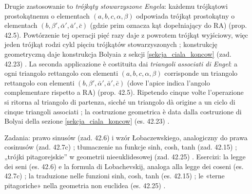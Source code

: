 Drugie zastosowanie to \emph{trójkąty stowarzyszone Engela}: każdemu trójkątowi prostokątnemu o elementach $(a, b, c, \alpha, \beta)$ odpowiada trójkąt prostokątny o elementach $(b, \beta', \bar\alpha', \bar a', \bar c)$ (gdzie prim oznacza kąt dopełniający do $\mathrm{RA}$) \cite[s. 409--410]{hartshorne_2000} (prop. 42.5). %
Powtórzenie tej operacji pięć razy daje z powrotem trójkąt wyjściowy, więc jeden trójkąt rodzi cykl pięciu trójkątów stowarzyszonych \cite[s. 411]{hartshorne_2000}; konstrukcję geometryczną daje konstrukcja Bolyaia z sekcji \ref{sekcja_ciala_koncow} (zad. 42.23) \cite[s. 411, 414]{hartshorne_2000}. %
La seconda applicazione è costituita dai \emph{triangoli associati di Engel}: a ogni triangolo rettangolo con elementi $(a, b, c, \alpha, \beta)$ corrisponde un triangolo rettangolo con elementi $(b, \beta', \bar\alpha', \bar a', \bar c)$ (dove l'apice indica l'angolo complementare rispetto a $\mathrm{RA}$) \cite[p. 409--410]{hartshorne_2000} (prop. 42.5). %
Ripetendo cinque volte l'operazione si ritorna al triangolo di partenza, sicché un triangolo dà origine a un ciclo di cinque triangoli associati \cite[p. 411]{hartshorne_2000}; la costruzione geometrica è data dalla costruzione di Bolyai della sezione \ref{sekcja_ciala_koncow} (es. 42.23) \cite[p. 411, 414]{hartshorne_2000}. %
%

Zadania: prawo sinusów (zad. 42.6) i wzór Łobaczewskiego, analogiczny do prawa cosinusów (zad. 42.7c) \cite[s. 411--412]{hartshorne_2000}; tłumaczenie na funkcje sinh, cosh, tanh (zad. 42.15) \cite[s. 413]{hartshorne_2000}; „trójki pitagorejskie'' w geometrii nieeuklidesowej (zad. 42.25) \cite[s. 415]{hartshorne_2000}. %
Esercizi: la legge dei seni (es. 42.6) e la formula di Lobachevskij, analoga alla legge dei coseni (es. 42.7c) \cite[p. 411--412]{hartshorne_2000}; la traduzione nelle funzioni sinh, cosh, tanh (es. 42.15) \cite[p. 413]{hartshorne_2000}; le «terne pitagoriche» nella geometria non euclidea (es. 42.25) \cite[p. 415]{hartshorne_2000}. %
